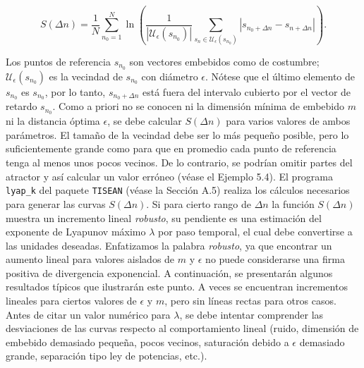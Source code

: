 \documentclass[10pt,a4paper]{book}
\begin{document}
\begin{equation}
S(\Delta n) = \frac{1}{N} \sum_{n_0=1}^{N} \ln \left( \frac{1}{|\mathcal{U}_\epsilon(s_{n_0})|} \sum_{s_n \in \mathcal{U}_\epsilon(s_{n_0})} |s_{n_0+\Delta n} - s_{n+\Delta n}| \right).
\end{equation}

Los puntos de referencia $s_{n_0}$ son vectores embebidos como de costumbre; $\mathcal{U}_\epsilon(s_{n_0})$ es la vecindad de $s_{n_0}$ con diámetro $\epsilon$. Nótese que el último elemento de $s_{n_0}$ es $s_{n_0}$, por lo tanto, $s_{n_0+\Delta n}$ está fuera del intervalo cubierto por el vector de retardo $s_{n_0}$. Como a priori no se conocen ni la dimensión mínima de embebido $m$ ni la distancia óptima $\epsilon$, se debe calcular $S(\Delta n)$ para varios valores de ambos parámetros. El tamaño de la vecindad debe ser lo más pequeño posible, pero lo suficientemente grande como para que en promedio cada punto de referencia tenga al menos unos pocos vecinos. De lo contrario, se podrían omitir partes del atractor y así calcular un valor erróneo (véase el Ejemplo 5.4). El programa \texttt{lyap\_k} del paquete \texttt{TISEAN} (véase la Sección A.5) realiza los cálculos necesarios para generar las curvas $S(\Delta n)$. Si para cierto rango de $\Delta n$ la función $S(\Delta n)$ muestra un incremento lineal \textit{robusto}, su pendiente es una estimación del exponente de Lyapunov máximo $\lambda$ por paso temporal, el cual debe convertirse a las unidades deseadas. Enfatizamos la palabra \textit{robusto}, ya que encontrar un aumento lineal para valores aislados de $m$ y $\epsilon$ no puede considerarse una firma positiva de divergencia exponencial. A continuación, se presentarán algunos resultados típicos que ilustrarán este punto. A veces se encuentran incrementos lineales para ciertos valores de $\epsilon$ y $m$, pero sin líneas rectas para otros casos. Antes de citar un valor numérico para $\lambda$, se debe intentar comprender las desviaciones de las curvas respecto al comportamiento lineal (ruido, dimensión de embebido demasiado pequeña, pocos vecinos, saturación debido a $\epsilon$ demasiado grande, separación tipo ley de potencias, etc.).

\bigskip
\end{document}
